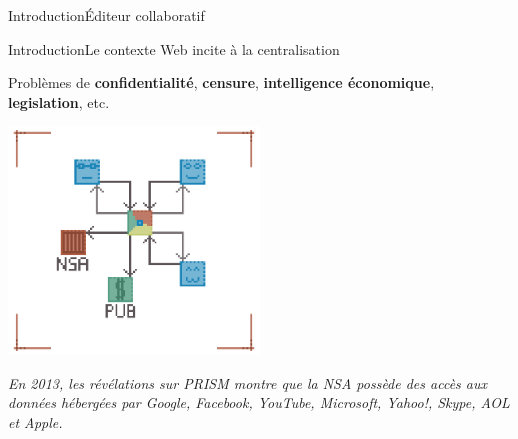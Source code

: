 \begin{frame}{Introduction}{Éditeur collaboratif}
  
  
\end{frame}


\begin{frame}{Introduction}{Le contexte Web incite à la centralisation}
  
  Problèmes de \textbf{confidentialité}, \textbf{censure},
  \textbf{intelligence économique}, \textbf{legislation}, etc.

  \vspace{0.5cm}
  \begin{center}
    \includegraphics[width=0.5\textwidth]{img/centralizedethicproblems.png}
  \end{center}
  
  \vspace{0.5cm}

  \textit{En 2013, les révélations sur PRISM montre que la NSA possède des
    accès aux données hébergées par Google, Facebook, YouTube, Microsoft,
    Yahoo!, Skype, AOL et Apple.}

\end{frame}

